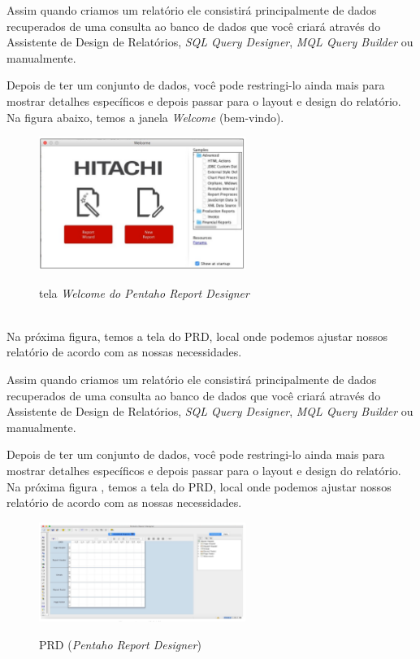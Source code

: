 Assim quando criamos um relat\'orio ele consistir\'{a} principalmente de dados recuperados de uma consulta ao banco de dados que você criar\'{a} atrav\'{e}s do Assistente de Design de Relat\'orios, \textit{SQL Query Designer}, \textit{MQL Query Builder} ou manualmente. 

Depois de ter um conjunto de dados, você pode restringi-lo ainda mais para mostrar detalhes específicos e depois passar para o layout e design do relat\'orio. Na figura abaixo, temos a janela \textit{Welcome} (bem-vindo).

\begin{figure}[H]
	\vspace*{0,2cm}
    \centering
    \caption{tela \textit{Welcome do Pentaho Report Designer}}
    \includegraphics[width=0.6\textwidth]{./04-figuras/figura-welcome-prd}
    \label{fig:ilustfigwelcomeprd}
\end{figure}
\vspace*{-0,9cm}
{\raggedright {}} \\
 
Na  pr\'oxima figura, temos a tela do PRD, local onde podemos ajustar nossos relat\'orio de acordo com as nossas
necessidades.

Assim quando criamos um relat\'orio ele consistir\'{a} principalmente de dados recuperados de uma consulta ao banco de dados que você criar\'{a} atrav\'{e}s do Assistente de Design de Relat\'orios, \textit{SQL Query Designer}, \textit{MQL Query Builder} ou manualmente. 

Depois de ter um conjunto de dados, você pode restringi-lo ainda mais para mostrar detalhes específicos e depois passar para o layout e design do relat\'orio. Na pr\'oxima figura , temos a tela do PRD, local onde podemos ajustar nossos relat\'orio de acordo com as nossas necessidades.

\begin{figure}[H]
	\vspace*{0,2cm}
    \centering
    \caption{PRD (\textit{Pentaho Report Designer})}
    \includegraphics[width=0.6\textwidth]{./04-figuras/figura-pentaho-prd}
    \label{fig:ilustfigpentahoprd}
\end{figure}
\vspace*{-0,9cm}
{\raggedright {}} \\

